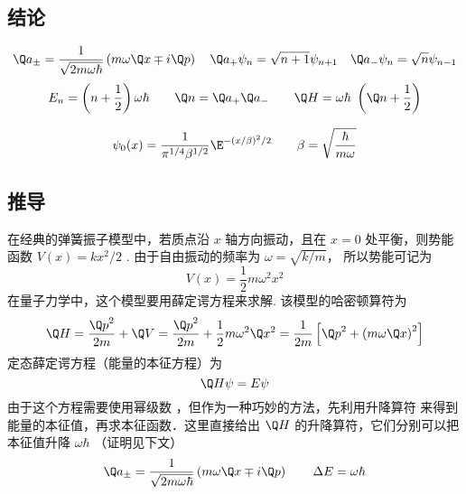 

\subsection{结论}
\begin{equation}
{\Q a_ \pm } = \frac{1}{\sqrt {2m\omega \hbar } }\left( {m\omega \Q x \mp i\Q p} \right)
\quad
{\Q a_ + }{\psi_n} = \sqrt {n + 1}    {\psi_{n + 1}}
\quad
{\Q a_ - }{\psi_n} = \sqrt n    {\psi_{n - 1}}
\end{equation}
\begin{equation}
 {E_n} = \left( {n+\frac{1}{2} } \right)\omega \hbar
\qquad
\Q n = {\Q a_ + }{\Q a_ - }
\qquad
\Q H = \omega \hbar {\text{ }}\left( {\Q n + \frac{1}{2}} \right)
\end{equation}

\begin{equation}
\psi_0 (x) = \frac{1}{{\pi ^{1/4}}{\beta ^{1/2}}}{\E^{ - {{(x/\beta )}^2}/2}}  \qquad \beta  = \sqrt {\frac{\hbar }{m\omega }}
\end{equation}

\subsection{推导}
在经典的弹簧振子模型中，若质点沿 $x$ 轴方向振动，且在 $x = 0$ 处平衡，则势能函数 $V\left( x \right) = k{x^2}/{2}$ . 由于自由振动的频率为 $\omega  = \sqrt {{k}/{m}} $， 所以势能可记为
\begin{equation}
  V\left( x \right) = \frac{1}{2}m{\omega ^2}{x^2}
\end{equation}
在量子力学中，这个模型要用薛定谔方程来求解. 该模型的哈密顿算符为
\begin{equation}
  \Q H = \frac{{\Q p}^2}{2m} + \Q V = \frac{{\Q p}^2}{2m} + \frac{1}{2}m{\omega ^2}{\Q x^2} = \frac{1}{2m}\left[ {{{\Q p}^2} + {{\left( {m\omega \Q x} \right)}^2}} \right]
\end{equation}
定态薛定谔方程（能量的本征方程）为
\begin{equation}\label{QSHOop_eq6}
  \Q H\psi  = E\psi
\end{equation}
由于这个方程需要使用幂级数%
，但作为一种巧妙的方法，先利用升降算符%
来得到能量的本征值，再求本征函数．这里直接给出 $\Q H$ 的升降算符，它们分别可以把本征值升降 $\omega\hbar$ （证明见下文）
\begin{equation}
{\Q a_ \pm } = \frac{1}{\sqrt {2m\omega \hbar } }\left( {m\omega \Q x \mp i\Q p} \right)
\qquad
\Delta E = \omega \hbar
\end{equation}

